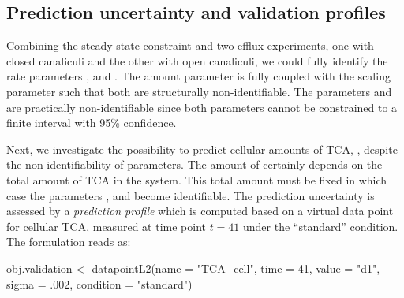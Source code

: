\documentclass[article]{jss}
\begin{document}
\subsection{Prediction uncertainty and validation profiles}

Combining the steady-state constraint and two efflux experiments, one with
closed canaliculi and the other with open canaliculi, we could fully identify
the rate parameters ,  and . The
amount parameter  is fully coupled with the scaling parameter
 such that both are structurally non-identifiable. The parameters
 and  are practically non-identifiable
since both parameters cannot be constrained to a finite interval with 95\%
confidence.

Next, we investigate the possibility to predict cellular amounts of TCA,
, despite the non-identifiability of parameters. 
The amount of  certainly depends on the total
amount of TCA in the system. This total amount must be fixed in which case the
parameters ,  and  become identifiable.
The prediction uncertainty is assessed by a \textit{prediction profile}
which is computed based on a virtual data point for cellular TCA, measured at
time point $t = 41$ under the ``standard'' condition. The  formulation reads as:
\begin{CodeChunk}
\begin{CodeInput}
obj.validation <- datapointL2(name = "TCA_cell",
			      time = 41,
			      value = "d1",
			      sigma = .002,
			      condition = "standard")
\end{CodeInput}
\end{CodeChunk}
\end{document}
